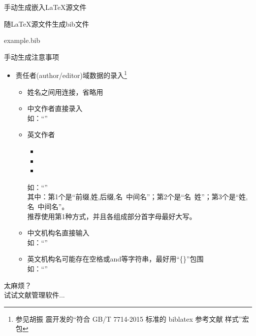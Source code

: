 \documentclass[fontset = none, t]{ctexbeamer}
\begin{document}
\begin{frame}[fragile]{手动生成}{嵌入\LaTeX 源文件}
\begin{spacing}{1.3}
\begin{center}
\begin{minipage}[h]{0.55\linewidth}
\begin{textcb}{随\LaTeX 源文件生成bib文件}
\begin{filecontents}{example.bib}
\begin{frame}[fragile]{手动生成}{注意事项}
  \begin{spacing}{1.2}
    \begin{itemize}
    \item 责任者(author/editor)域数据的录入\footnote[frame,2]{参见胡振
        震开发的\enquote{符合 GB/T 7714-2015 标准的 biblatex 参考文献
          样式}宏包}
      \begin{itemize}
      \item 姓名之间用连接，省略用
      \item 中文作者直接录入\\
        {\tiny 如：}\enquote{}
      \item 英文作者
        \begin{itemize}
        \item {}
        \item {}
        \item {}
        \end{itemize}
        {\tiny 如：}\enquote{}\\
        {\tiny 其中：第1个是\enquote{前缀,姓,后缀,名\ 中间名}；第2个是\enquote{名\ 姓}；第3个是\enquote{姓,名\ 中间名}。}\\
        {\tiny \alert{推荐}使用第1种方式，并且各组成部分首字母最好大写。}
      \item 中文机构名直接输入\\
        {\tiny 如：}\enquote{}
      \item 英文机构名可能存在空格或and等字符串，最好用\enquote{\{\}}包围\\
        {\tiny 如：}\enquote{}
      \end{itemize}
    \end{itemize}    
  \end{spacing}  
\end{frame}

\begin{frame}
  太麻烦？\\
  试试文献管理软件...
\end{frame}

\end{filecontents}
\end{textcb}
\end{minipage}
\end{center}
\end{spacing}
\end{frame}
\end{document}
